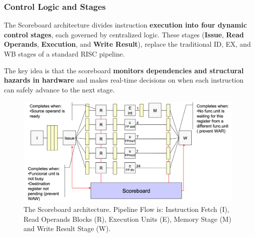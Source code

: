 \subsubsection{Control Logic and Stages}

The Scoreboard architecture divides instruction \textbf{execution into four dynamic control stages}, each governed by centralized logic. These stages (\textbf{Issue}, \textbf{Read Operands}, \textbf{Execution}, and \textbf{Write Result}), replace the traditional ID, EX, and WB stages of a standard RISC pipeline.

\highspace
The key idea is that the scoreboard \textbf{monitors dependencies and structural hazards in hardware} and makes real-time decisions on when each instruction can safely advance to the next stage.

\begin{figure}[!htp]
    \centering
    \includegraphics[width=\textwidth]{img/scoreboard-arch.png}
    \caption{The Scoreboard architecture. Pipeline Flow is: Instruction Fetch (I), Read Operands Blocks (R), Execution Units (E), Memory Stage (M) and Write Result Stage (W).}
\end{figure}

